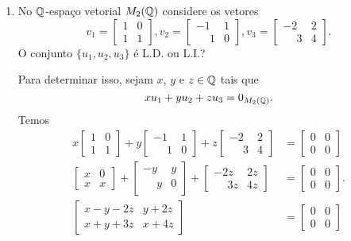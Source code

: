 \begin{exemplos}
\begin{enumerate}
    \item No $\mathbb{Q}$-espaço vetorial $M_2(\mathbb{Q})$ considere os vetores
      \[
        v_1 = \begin{bmatrix}1 & 0\\1 & 1\end{bmatrix},
        v_2 = \begin{bmatrix}-1 & 1\\\phantom{-} 1 & 0\end{bmatrix},
        v_3 = \begin{bmatrix}-2 & 2\\\phantom{-} 3 & 4\end{bmatrix}.
      \]
      O conjunto $\{u_1, u_2, u_3\}$ é L.D. ou L.I.?
      \begin{solucao}
        Para determinar isso, sejam $x$, $y$ e $z \in \mathbb{Q}$ tais que
        \[
          xu_1 + yu_2 + zu_3 = 0_{M_2(\mathbb{Q})}.
        \]
        Temos
        \begin{align*}
          x\begin{bmatrix}1 & 0\\1 & 1\end{bmatrix}
          + y\begin{bmatrix}-1 & 1\\\phantom{-} 1 & 0\end{bmatrix}
          + z\begin{bmatrix}-2 & 2\\\phantom{-} 3 & 4\end{bmatrix}
                               &= \begin{bmatrix}0 & 0\\0 & 0\end{bmatrix}
          \\\begin{bmatrix}x & 0\\x & x\end{bmatrix}
          + \begin{bmatrix}-y & y\\\phantom{-} y & 0\end{bmatrix}
          + \begin{bmatrix}-2z & 2z\\\phantom{-} 3z & 4z\end{bmatrix}
                               &= \begin{bmatrix}0 & 0\\0 & 0\end{bmatrix}.
          \\\begin{bmatrix} x - y - 2z & y + 2z\\x + y + 3z & x + 4z\end{bmatrix} &= \begin{bmatrix}0 & 0\\0 & 0\end{bmatrix}

\end{align*}
\end{solucao}
\end{enumerate}
\end{exemplos}
